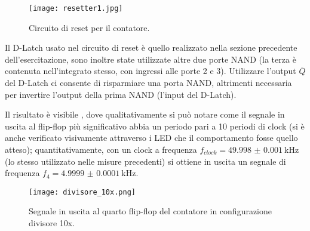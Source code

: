 \begin{figure}[h]
	\centering
	\texttt{[image: resetter1.jpg]}
	\caption{Circuito di reset per il contatore.}
	\label{fig:reset}
\end{figure}

Il D-Latch usato nel circuito di reset è quello realizzato nella sezione precedente dell'esercitazione, sono inoltre state utilizzate altre due porte NAND (la terza è contenuta nell'integrato stesso, con ingressi alle porte 2 e 3). Utilizzare l'output $\overline{Q}$ del D-Latch ci consente di risparmiare una porta NAND, altrimenti necessaria per invertire l'output della prima NAND (l'input del D-Latch).

Il risultato è visibile , dove qualitativamente si può notare come il segnale in uscita al flip-flop più significativo abbia un periodo pari a 10 periodi di clock (si è anche verificato visivamente attraverso i LED che il comportamento fosse quello atteso); quantitativamente, con un clock a frequenza $f_{clock} = \SI{49.998(1)}{ \kilo \hertz}$ (lo stesso utilizzato nelle misure precedenti) si ottiene in uscita un segnale di frequenza $f_{4} = \SI{4.9999(1)}{ \kilo \hertz}$.

\begin{figure}[h]
	\centering
	\texttt{[image: divisore\_10x.png]}
	\caption{Segnale in uscita al quarto flip-flop del contatore in configurazione divisore 10x.}
	\label{fig:div10}
\end{figure}
